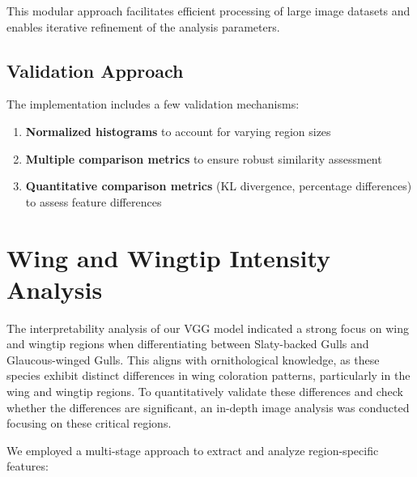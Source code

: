 \documentclass[a4paper,12pt]{report}
\begin{document}
This modular approach facilitates efficient processing of large image datasets and enables iterative refinement of the analysis parameters.

\subsection{Validation Approach}

The implementation includes a few validation mechanisms:

\begin{enumerate}
    \item \textbf{Normalized histograms} to account for varying region sizes
    \item \textbf{Multiple comparison metrics} to ensure robust similarity assessment
    \item \textbf{Quantitative comparison metrics} (KL divergence, percentage differences) to assess feature differences
\end{enumerate}

\section{Wing and Wingtip Intensity Analysis}
The interpretability analysis of our VGG model indicated a strong focus on wing and wingtip regions when differentiating between Slaty-backed Gulls and Glaucous-winged Gulls. This aligns with ornithological knowledge, as these species exhibit distinct differences in wing coloration patterns, particularly in the wing and wingtip regions. To quantitatively validate these differences and check whether the differences are significant, an in-depth image analysis was conducted focusing on these critical regions.


We employed a multi-stage approach to extract and analyze region-specific features:
\end{document}
